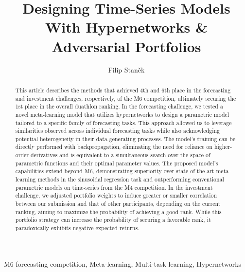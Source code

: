 \documentclass[3p,times,twocolumn]{elsarticle}
\begin{document}
\begin{frontmatter}

    \title{
        Designing Time-Series Models With Hypernetworks \& Adversarial Portfolios
    }
    \author{
        Filip Staněk
    }
    \address{
        CERGE-EI
    }

    \dochead{}

    \begin{abstract}
        This article describes the methods that achieved 4th and 6th place in the forecasting and investment challenges, respectively, of the M6 competition, ultimately securing the 1st place in the overall duathlon ranking.
        In the forecasting challenge, we tested a novel meta-learning model that utilizes hypernetworks to design a parametric model tailored to a specific family of forecasting tasks.
        This approach allowed us to leverage similarities observed across individual forecasting tasks while also acknowledging potential heterogeneity in their data generating processes.
        The model's training can be directly performed with backpropagation, eliminating the need for reliance on higher-order derivatives and is equivalent to a simultaneous search over the space of parametric functions and their optimal parameter values.
        The proposed model's capabilities extend beyond M6, demonstrating superiority over state-of-the-art meta-learning methods in the sinusoidal regression task and outperforming conventional parametric models on time-series from the M4 competition.
        In the investment challenge, we adjusted portfolio weights to induce greater or smaller correlation between our submission and that of other participants, depending on the current ranking, aiming to maximize the probability of achieving a good rank.
        While this portfolio strategy can increase the probability of securing a favorable rank, it paradoxically exhibits negative expected returns.
    \end{abstract}

    \begin{keyword}
        M6 forecasting competition, Meta-learning, Multi-task learning, Hypernetworks
    \end{keyword}

\end{frontmatter}
\end{document}
